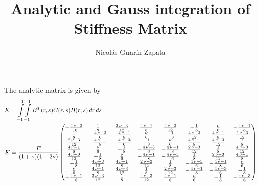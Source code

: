 \documentclass[12pt,letterpaper]{article}
\author{Nicol\'as Guar\'in-Zapata}
\title{\textbf{Analytic and Gauss integration of Stiffness Matrix}}
\begin{document}
\maketitle

The analytic matrix is given by
\begin{align*}
K &= \int\limits_{-1}^{1}\int\limits_{-1}^{1} B^T(r,s) C(r,s) B(r,s)\, dr\, ds\\
K &= \frac{E}{(1+\nu)(1-2\nu)}\begin{pmatrix}-\frac{4\,\nu-3}{6} & \frac{1}{8} & \frac{2\,\nu-3}{12} & \frac{4\,\nu-1}{8} & \frac{4\,\nu-3}{12} & -\frac{1}{8} & \frac{\nu}{6} & -\frac{4\,\nu-1}{8}\cr \frac{1}{8} & -\frac{4\,\nu-3}{6} & -\frac{4\,\nu-1}{8} & \frac{\nu}{6} & -\frac{1}{8} & \frac{4\,\nu-3}{12} & \frac{4\,\nu-1}{8} & \frac{2\,\nu-3}{12}\cr \frac{2\,\nu-3}{12} & -\frac{4\,\nu-1}{8} & -\frac{4\,\nu-3}{6} & -\frac{1}{8} & \frac{\nu}{6} & \frac{4\,\nu-1}{8} & \frac{4\,\nu-3}{12} & \frac{1}{8}\cr \frac{4\,\nu-1}{8} & \frac{\nu}{6} & -\frac{1}{8} & -\frac{4\,\nu-3}{6} & -\frac{4\,\nu-1}{8} & \frac{2\,\nu-3}{12} & \frac{1}{8} & \frac{4\,\nu-3}{12}\cr \frac{4\,\nu-3}{12} & -\frac{1}{8} & \frac{\nu}{6} & -\frac{4\,\nu-1}{8} & -\frac{4\,\nu-3}{6} & \frac{1}{8} & \frac{2\,\nu-3}{12} & \frac{4\,\nu-1}{8}\cr -\frac{1}{8} & \frac{4\,\nu-3}{12} & \frac{4\,\nu-1}{8} & \frac{2\,\nu-3}{12} & \frac{1}{8} & -\frac{4\,\nu-3}{6} & -\frac{4\,\nu-1}{8} & \frac{\nu}{6}\cr \frac{\nu}{6} & \frac{4\,\nu-1}{8} & \frac{4\,\nu-3}{12} & \frac{1}{8} & \frac{2\,\nu-3}{12} & -\frac{4\,\nu-1}{8} & -\frac{4\,\nu-3}{6} & -\frac{1}{8}\cr -\frac{4\,\nu-1}{8} & \frac{2\,\nu-3}{12} & \frac{1}{8} & \frac{4\,\nu-3}{12} & \frac{4\,\nu-1}{8} & \frac{\nu}{6} & -\frac{1}{8} & -\frac{4\,\nu-3}{6}\end{pmatrix}
\end{align*}
\end{document}
